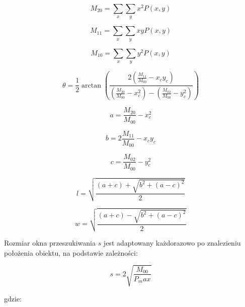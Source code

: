 \begin{equation}
\label{equ:CAMSHIFT_moment_drugi_xx}
	M_{20} = \sum_x \sum_y x^2 P(x,y)
\end{equation}

\begin{equation}
\label{equ:CAMSHIFT_moment_drugi_xy}
	M_{11} = \sum_x \sum_y x y P(x,y)
\end{equation}

\begin{equation}
\label{equ:CAMSHIFT_moment_drugi_yy}
	M_{10} = \sum_x \sum_y y^2 P(x,y)
\end{equation}

\begin{equation}
\label{equ:CAMSHIFT_orientacja}
	\theta = \frac{1}{2} \arctan \left( \frac{2 \left( \frac{M_{11}}{M_{00}} - x_c y_c \right)}{\left( \frac{M_{20}}{M_{00}} - x_c^2 \right) - \left( \frac{M_{02}}{M_00} - y_c^2 \right) } \right)
\end{equation}

\begin{equation}
\label{equ:CAMSHIFT_wspolczynnik_a}
	a = \frac{M_{20}}{M_{00}} - x_c^2
\end{equation}

\begin{equation}
\label{equ:CAMSHIFT_wspolczynnik_b}
	b = 2 \frac{M_{11}}{M_{00}} - x_c y_c
\end{equation}

\begin{equation}
\label{equ:CAMSHIFT_wspolczynnik_c}
	c = \frac{M_{02}}{M_{00}} - y_c^2
\end{equation}

\begin{equation}
\label{equ:CAMSHIFT_dlugosc}
	l = \sqrt{\frac{(a + c) + \sqrt{b^2 + (a-c)^2}}{2}}
\end{equation}

\begin{equation}
\label{equ:CAMSHIFT_szerokosc}
	w = \sqrt{\frac{(a + c) - \sqrt{b^2 + (a-c)^2}}{2}}
\end{equation}

Rozmiar okna przeszukiwania $s$ jest adaptowany każdorazowo po znalezieniu położenia obiektu, na podstawie zależności:

\begin{equation}
\label{equ:CAMSHIFT_rozmiar_okna}
	s = 2 \sqrt{\frac{M_{00}}{P_max}}
\end{equation}

\noindent
gdzie:


